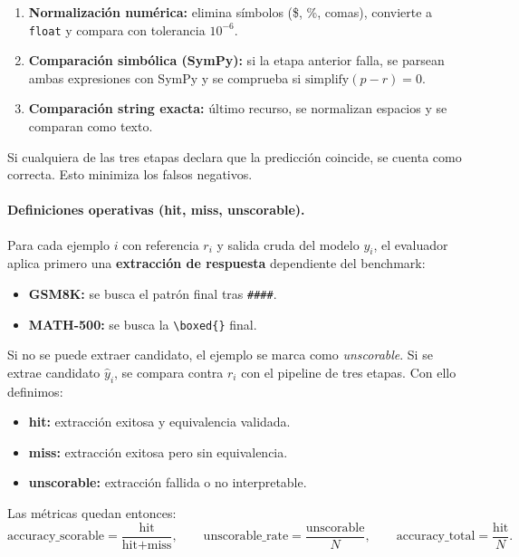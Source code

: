 \documentclass[11pt,a4paper]{article}
\begin{document}
\begin{enumerate}
  \item \textbf{Normalizaci\'on num\'erica:} elimina s\'imbolos
    (\$, \%, comas), convierte a \texttt{float} y compara con
    tolerancia $10^{-6}$.
  \item \textbf{Comparaci\'on simb\'olica (SymPy):} si la etapa
    anterior falla, se parsean ambas expresiones con SymPy y se
    comprueba si $\text{simplify}(p - r) = 0$.
  \item \textbf{Comparaci\'on string exacta:} \'ultimo recurso, se
    normalizan espacios y se comparan como texto.
\end{enumerate}

Si cualquiera de las tres etapas declara que la predicci\'on coincide,
se cuenta como correcta. Esto minimiza los falsos negativos.

\paragraph{Definiciones operativas (hit, miss, unscorable).}\label{sec:hit-unscorable}
Para cada ejemplo $i$ con referencia $r_i$ y salida cruda del modelo
$y_i$, el evaluador aplica primero una \textbf{extracci\'on de respuesta}
dependiente del benchmark:
\begin{itemize}[leftmargin=2em]
  \item \textbf{GSM8K:} se busca el patr\'on final tras \texttt{\#\#\#\#}.
  \item \textbf{MATH-500:} se busca la \texttt{\textbackslash boxed\{\}} final.
\end{itemize}

Si no se puede extraer candidato, el ejemplo se marca como
\emph{unscorable}. Si se extrae candidato $\hat{y}_i$, se compara contra
$r_i$ con el pipeline de tres etapas. Con ello definimos:
\begin{itemize}[leftmargin=2em]
  \item \textbf{hit:} extracci\'on exitosa y equivalencia validada.
  \item \textbf{miss:} extracci\'on exitosa pero sin equivalencia.
  \item \textbf{unscorable:} extracci\'on fallida o no interpretable.
\end{itemize}

Las m\'etricas quedan entonces:
\[
\text{accuracy\_scorable} = \frac{\text{hit}}{\text{hit}+\text{miss}},\qquad
\text{unscorable\_rate} = \frac{\text{unscorable}}{N},\qquad
\text{accuracy\_total} = \frac{\text{hit}}{N}.
\]
\end{document}

